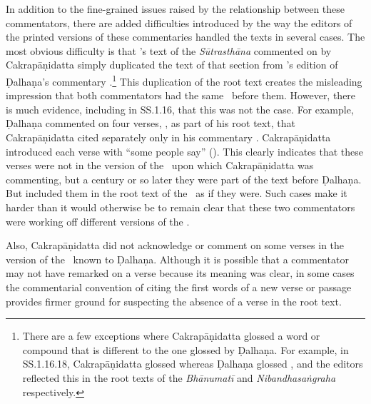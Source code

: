 In addition to the fine-grained issues raised by the relationship between these
commentators, there are added difficulties introduced by the way the editors of
the printed versions of these commentaries handled the texts in several cases. The
most obvious difficulty is that \citeauthor{acar-1939}'s text of the
\emph{Sūtrasthāna} commented on by Cakrapāṇidatta \citep{acar-1939} simply
duplicated the text of that section from \citeauthor{vulgate}'s edition of
Ḍalhaṇa's commentary \citep{vulgate}.\footnote{There are a few exceptions where
Cakrapāṇidatta glossed a word or compound that is different to the one glossed by
Ḍalhaṇa. For example, in SS.1.16.18, Cakrapāṇidatta glossed 
whereas Ḍalhaṇa glossed , and the editors reflected this in the
root texts of the \emph{Bhānumatī} \citep[130]{acar-1939} and
\emph{Nibandhasaṅgraha} \citep[79]{vulgate} respectively.} This duplication of the
root text creates the misleading impression that both commentators had the same
\SS\ before them. However, there is much evidence, including in SS.1.16, that this
was not the case. For example, Ḍalhaṇa commented on four verses,
, as part of his root text, that Cakrapāṇidatta cited
separately only in his commentary \citep[128–129]{acar-1939}.  Cakrapāṇidatta
introduced each verse with “some people say” (). This clearly
indicates that these verses were not in the version of the \SS\ upon which
Cakrapāṇidatta was commenting, but a century or so later they were part of the
text before Ḍalhaṇa.  But \citeauthor{acar-1939} included them in the root text
of the \SS\ as if they were.  Such cases make it harder than it would otherwise be
to remain clear that these two commentators were working off different versions of
the \SS.

Also, Cakrapāṇidatta did not acknowledge or comment on some verses in the version
of the \SS\ known to Ḍalhaṇa. Although it is possible that a commentator may not
have remarked on a verse because its meaning was clear, in some cases the
commentarial convention of citing the first words of a new verse or passage
provides firmer ground for suspecting the absence of a verse in the root text. 

